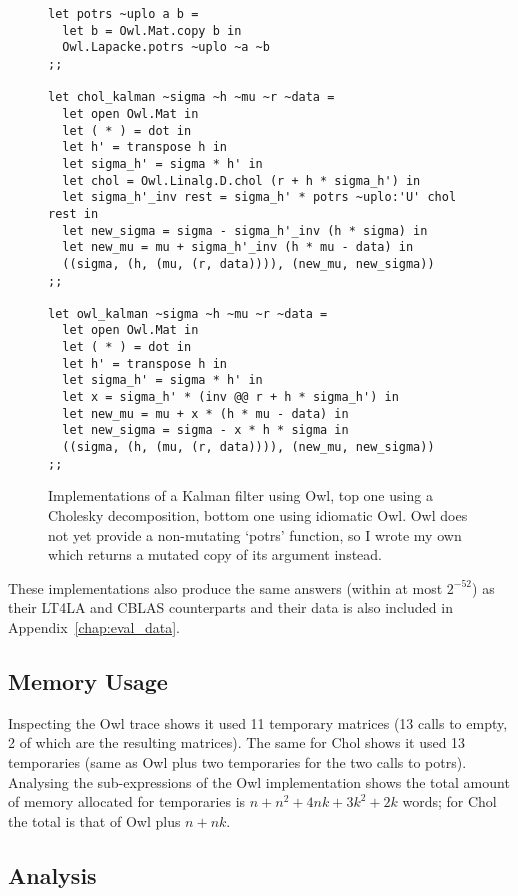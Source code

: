 \begin{figure}[tp]
    \begin{verbatim}
let potrs ~uplo a b =
  let b = Owl.Mat.copy b in
  Owl.Lapacke.potrs ~uplo ~a ~b
;;

let chol_kalman ~sigma ~h ~mu ~r ~data =
  let open Owl.Mat in
  let ( * ) = dot in
  let h' = transpose h in
  let sigma_h' = sigma * h' in
  let chol = Owl.Linalg.D.chol (r + h * sigma_h') in
  let sigma_h'_inv rest = sigma_h' * potrs ~uplo:'U' chol rest in
  let new_sigma = sigma - sigma_h'_inv (h * sigma) in
  let new_mu = mu + sigma_h'_inv (h * mu - data) in
  ((sigma, (h, (mu, (r, data)))), (new_mu, new_sigma))
;;

let owl_kalman ~sigma ~h ~mu ~r ~data =
  let open Owl.Mat in
  let ( * ) = dot in
  let h' = transpose h in
  let sigma_h' = sigma * h' in
  let x = sigma_h' * (inv @@ r + h * sigma_h') in
  let new_mu = mu + x * (h * mu - data) in
  let new_sigma = sigma - x * h * sigma in
  ((sigma, (h, (mu, (r, data)))), (new_mu, new_sigma))
;;
    \end{verbatim}
    \caption{Implementations of a Kalman filter using Owl, top one using a
        Cholesky decomposition, bottom one using idiomatic Owl. Owl does not
        yet provide a non-mutating `potrs' function, so I wrote my own which
        returns a mutated copy of its argument instead.}\label{fig:chol_owl_kalman}

\end{figure}

These implementations also produce the same answers (within at most $2^{-52}$)
as their LT4LA and CBLAS counterparts and their data is also included in
Appendix~\ref{chap:eval_data}.

\subsection{Memory Usage}

Inspecting the Owl trace shows it used 11 temporary matrices (13 calls to
empty, 2 of which are the resulting matrices). The same for Chol shows it used
13 temporaries (same as Owl plus two temporaries for the two calls to potrs).
Analysing the sub-expressions of the Owl implementation shows the total amount
of memory allocated for temporaries is $n + n^2 + 4nk + 3k^2 + 2k$ words; for
Chol the total is that of Owl plus $n + nk$.

\subsection{Analysis}

